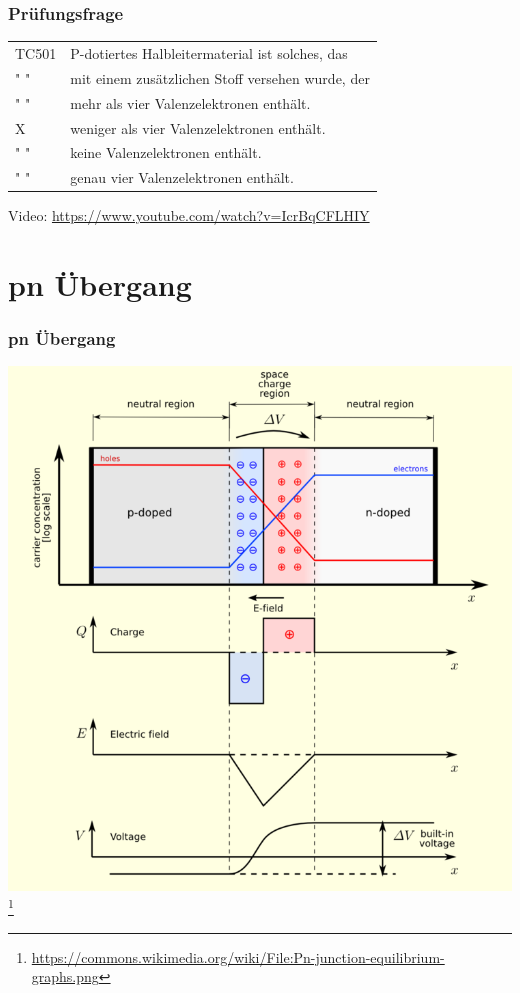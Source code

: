 \begin{frame}
    \frametitle{Prüfungsfrage}

    \begin{center}
    \begin{tabular}{l||l}\hline
        TC501 &P-dotiertes Halbleitermaterial ist solches, das \\
         " "  &mit einem zusätzlichen Stoff versehen wurde, der \\ \hline\hline
         " " & mehr als vier Valenzelektronen enthält.\\\hline
         X & weniger als vier Valenzelektronen enthält. \\\hline
         " " & keine Valenzelektronen enthält. \\ \hline
         " " & genau vier Valenzelektronen enthält.\\\hline
    \end{tabular}
 	\end{center}
 	Video: \url{https://www.youtube.com/watch?v=IcrBqCFLHIY}
\end{frame}

\section*{pn Übergang}

\begin{frame}
    \frametitle{pn Übergang}
    \begin{center}
        \includegraphics[width=.7\textwidth]{e12/pn-Diagram.png}
        \footnote{\tiny \url{https://commons.wikimedia.org/wiki/File:Pn-junction-equilibrium-graphs.png}}
	\end{center}
\end{frame}

